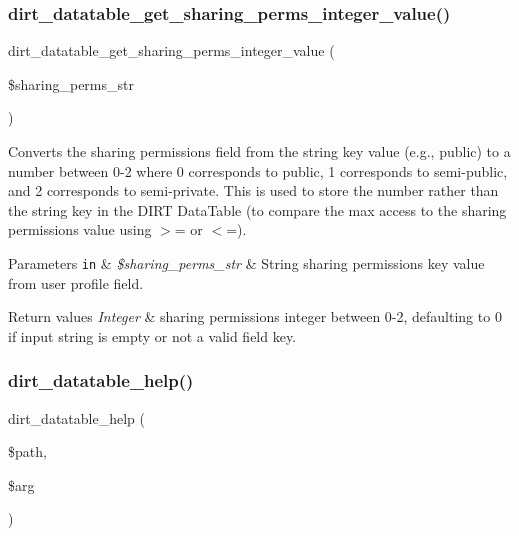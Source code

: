 \subsubsection{\texorpdfstring{dirt\+\_\+datatable\+\_\+get\+\_\+sharing\+\_\+perms\+\_\+integer\+\_\+value()}{dirt\_datatable\_get\_sharing\_perms\_integer\_value()}}
{\footnotesize\ttfamily dirt\+\_\+datatable\+\_\+get\+\_\+sharing\+\_\+perms\+\_\+integer\+\_\+value (\begin{DoxyParamCaption}\item[{}]{\$sharing\+\_\+perms\+\_\+str }\end{DoxyParamCaption})}

Converts the sharing permissions field from the string key value (e.\+g., \textquotesingle{}public\textquotesingle{}) to a number between 0-\/2 where 0 corresponds to public, 1 corresponds to semi-\/public, and 2 corresponds to semi-\/private. This is used to store the number rather than the string key in the D\+I\+RT Data\+Table (to compare the max access to the sharing permissions value using $>$= or $<$=).


\begin{DoxyParams}[1]{Parameters}
\mbox{\tt in}  & {\em \$sharing\+\_\+perms\+\_\+str} & String sharing permissions key value from user profile field.\\
\hline
\end{DoxyParams}

\begin{DoxyRetVals}{Return values}
{\em Integer} & sharing permissions integer between 0-\/2, defaulting to 0 if input string is empty or not a valid field key. \\
\hline
\end{DoxyRetVals}
\mbox{\label{dirt__datatable_8module_a9a6048325dc33f1e26d02e190ea7de12}} 
\subsubsection{\texorpdfstring{dirt\+\_\+datatable\+\_\+help()}{dirt\_datatable\_help()}}
{\footnotesize\ttfamily dirt\+\_\+datatable\+\_\+help (\begin{DoxyParamCaption}\item[{}]{\$path,  }\item[{}]{\$arg }\end{DoxyParamCaption})}

